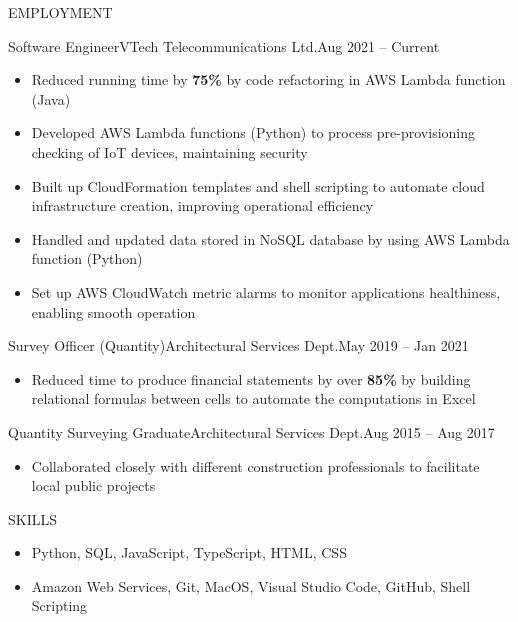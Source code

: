 \documentclass[]{resume}
\begin{document}
	\makeheader
	
	\begin{cvsection}{EMPLOYMENT}
		\begin{cvsubsection}{Software Engineer}{VTech Telecommunications Ltd.}{Aug 2021 -- Current}
			\begin{itemize}
				\item Reduced running time by \textbf{75\%} by code refactoring in AWS Lambda function (Java)
				\item Developed AWS Lambda functions (Python) to process pre-provisioning checking of IoT devices, maintaining security
				\item Built up CloudFormation templates and shell scripting to automate cloud infrastructure creation, improving operational efficiency
				\item Handled and updated data stored in NoSQL database by using AWS Lambda function (Python)
				\item  Set up AWS CloudWatch metric alarms to monitor applications healthiness, enabling smooth operation
			\end{itemize}
		\end{cvsubsection}
		
		\begin{cvsubsection}{Survey Officer (Quantity)}{Architectural Services Dept.}{May 2019 -- Jan 2021}	
			\begin{itemize}
				\item Reduced time to produce financial statements by over \textbf{85\%} by building relational formulas between cells to automate the computations in Excel
			\end{itemize}
		\end{cvsubsection}
		
		\begin{cvsubsection}{Quantity Surveying Graduate}{Architectural Services Dept.}{Aug 2015 -- Aug 2017}		
			\begin{itemize}
				\item Collaborated closely with different construction professionals to facilitate local public projects
			\end{itemize}
		\end{cvsubsection}
	\end{cvsection}

	\begin{cvsection}{SKILLS}
		\begin{cvsubsection}{}{}{}	
			\begin{itemize}
				\item Python, SQL, JavaScript, TypeScript, HTML, CSS 
				\item Amazon Web Services, Git, MacOS, Visual Studio Code, GitHub, Shell Scripting
			\end{itemize}
		\end{cvsubsection}
	\end{cvsection}
	
\end{document}
